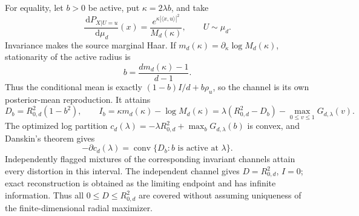 \documentclass[11pt,a4paper]{article}
\theoremstyle{remark}
\newcommand{\dd}{\,\mathrm{d}}
\begin{document}
For equality, let $b>0$ be active, put $\kappa=2\lambda b$, and take
\begin{equation}
 \frac{\dd P_{X|U=u}}{\dd\mu_d}(x)
 =\frac{e^{\kappa|\langle x,u\rangle|^2}}{M_d(\kappa)},
 \qquad U\sim\mu_d.
 \label{eq:appendix-bingham}
\end{equation}
Invariance makes the source marginal Haar.  If
$m_d(\kappa)=\partial_\kappa\log M_d(\kappa)$, stationarity of the active
radius is
\begin{equation}
 b=\frac{d m_d(\kappa)-1}{d-1}.
 \label{eq:appendix-self-consistency}
\end{equation}
Thus the conditional mean is exactly $(1-b)I/d+b\rho_u$, so the channel is
its own posterior-mean reproduction.  It attains
\begin{equation}
 D_b=R_{0,d}^2(1-b^2),\qquad
 I_b=\kappa m_d(\kappa)-\log M_d(\kappa)
 =\lambda(R_{0,d}^2-D_b)-\max_{0\le v\le1}G_{d,\lambda}(v).
 \label{eq:appendix-branch}
\end{equation}
The optimized log partition
$c_d(\lambda)=-\lambda R_{0,d}^2+\max_bG_{d,\lambda}(b)$ is convex, and
Danskin's theorem gives
\begin{equation}
 -\partial c_d(\lambda)
 =\operatorname{conv}\{D_b:b\text{ is active at }\lambda\}.
 \label{eq:appendix-danskin}
\end{equation}
Independently flagged mixtures of the corresponding invariant channels attain
every distortion in this interval.  The independent channel gives
$D=R_{0,d}^2$, $I=0$; exact reconstruction is obtained as the limiting
endpoint and has infinite information.  Thus all
$0\le D\le R_{0,d}^2$ are covered without assuming uniqueness of the
finite-dimensional radial maximizer.

\printbibliography
\end{document}
